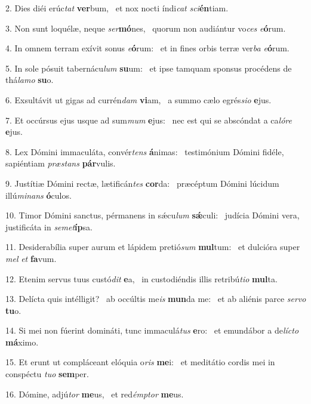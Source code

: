 2. Dies diéi erúc\textit{tat} \textbf{ver}bum, \ast\  et nox nocti índi\textit{cat} \textit{sci}\textbf{én}tiam.\

3. Non sunt loquélæ, neque \textit{ser}\textbf{mó}nes, \ast\  quorum non audiántur vo\textit{ces} \textit{e}\textbf{ó}rum.\

4. In omnem terram exívit sonus \textit{e}\textbf{ó}rum: \ast\  et in fines orbis terræ ver\textit{ba} \textit{e}\textbf{ó}rum.\

5. In sole pósuit tabernácu\textit{lum} \textbf{su}um: \ast\  et ipse tamquam sponsus procédens de thá\textit{la}\textit{mo} \textbf{su}o.\

6. Exsultávit ut gigas ad currén\textit{dam} \textbf{vi}am, \ast\  a summo cælo egrés\textit{si}\textit{o} \textbf{e}jus.\

7. Et occúrsus ejus usque ad sum\textit{mum} \textbf{e}jus: \ast\  nec est qui se abscóndat a ca\textit{ló}\textit{re} \textbf{e}jus.\

8. Lex Dómini immaculáta, convér\textit{tens} \textbf{á}nimas: \ast\  testimónium Dómini fidéle, sapiéntiam \textit{præ}\textit{stans} \textbf{pár}vulis.\

9. Justítiæ Dómini rectæ, lætificán\textit{tes} \textbf{cor}da: \ast\  præcéptum Dómini lúcidum illú\textit{mi}\textit{nans} \textbf{ó}culos.\

10. Timor Dómini sanctus, pérmanens in sǽcu\textit{lum} \textbf{sǽ}culi: \ast\  judícia Dómini vera, justificáta in \textit{se}\textit{met}\textbf{íp}sa.\

11. Desiderabília super aurum et lápidem pretió\textit{sum} \textbf{mul}tum: \ast\  et dulcióra super \textit{mel} \textit{et} \textbf{fa}vum.\

12. Etenim servus tuus custó\textit{dit} \textbf{e}a, \ast\  in custodiéndis illis retribú\textit{ti}\textit{o} \textbf{mul}ta.\

13. Delícta quis intélligit? \dag\  ab occúltis me\textit{is} \textbf{mun}da me: \ast\  et ab aliénis parce \textit{ser}\textit{vo} \textbf{tu}o.\

14. Si mei non fúerint domináti, tunc immaculá\textit{tus} \textbf{e}ro: \ast\  et emundábor a de\textit{líc}\textit{to} \textbf{má}ximo.\

15. Et erunt ut compláceant elóquia o\textit{ris} \textbf{me}i: \ast\  et meditátio cordis mei in conspéctu \textit{tu}\textit{o} \textbf{sem}per.\

16. Dómine, adjú\textit{tor} \textbf{me}us, \ast\  et red\textit{émp}\textit{tor} \textbf{me}us.\

